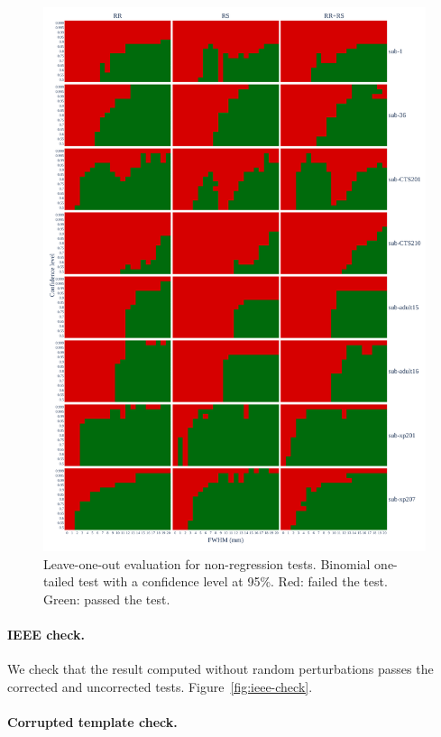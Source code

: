 \documentclass{article}
\begin{document}
\begin{figure}
    \centering
    \includegraphics[width=\linewidth]{figures/exclude_mct_fwe_bonferroni.pdf}
    \caption{Leave-one-out evaluation for non-regression tests.
        Binomial one-tailed test with a confidence level at 95\%.
        Red: failed the test. Green: passed the test.}
    \label{fig:loo_bonferroni}
\end{figure}


\paragraph{IEEE check.} We check that the result computed without random perturbations
passes the corrected and uncorrected tests.
Figure~\ref{fig:ieee-check}.

\paragraph{Corrupted template check.}
\end{document}
